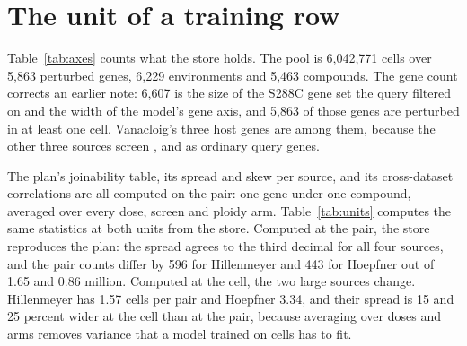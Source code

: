 
\section{The unit of a training row}
\label{sec:units}

Table~\ref{tab:axes} counts what the store holds. The pool is 6{,}042{,}771 cells over
5{,}863 perturbed genes, 6{,}229 environments and 5{,}463 compounds. The gene count
corrects an earlier note: 6{,}607 is the size of the S288C gene set the query filtered on
and the width of the model's gene axis, and 5{,}863 of those genes are perturbed in at
least one cell. Vanacloig's three host genes are among them, because the other three
sources screen ,  and  as ordinary query genes.

\begin{table}[htbp]
\centering
\footnotesize
\caption{The store per source. Measurements are served records, cells are store entries,
and the last three columns count cells whose environment doses no compound, doses two, or
doses a compound that carries no InChIKey. The bottom row counts genes, environments and
compounds once across the pool.}
\label{tab:axes}

\end{table}

The plan's joinability table, its spread and skew per source, and its cross-dataset
correlations are all computed on the pair: one gene under one compound, averaged over
every dose, screen and ploidy arm. Table~\ref{tab:units} computes the same statistics at
both units from the store. Computed at the pair, the store reproduces the plan: the spread
agrees to the third decimal for all four sources, and the pair counts differ by 596 for
Hillenmeyer and 443 for Hoepfner out of 1.65 and 0.86 million. Computed at the cell, the
two large sources change. Hillenmeyer has 1.57 cells per pair and Hoepfner 3.34, and their
spread is 15 and 25 percent wider at the cell than at the pair, because averaging over
doses and arms removes variance that a model trained on cells has to fit.

\begin{table}[htbp]
\centering
\footnotesize
\caption{The same response statistics at the store's unit and at the plan's. Pairs are
(gene, compound) means computed from the store's measurements; plan pairs and the plan
columns are the 031 values. Vanacloig and Wildenhain have one cell per pair, so their
columns coincide.}
\label{tab:units}

\end{table}

